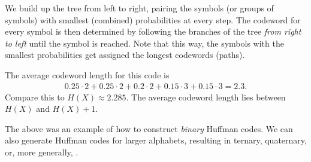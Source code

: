 \begin{example}
\begin{center}
\end{center}
We build up the tree from left to right, pairing the symbols (or groups of symbols) with smallest (combined) probabilities at every step. The codeword for every symbol is then determined by following the branches of the tree \emph{from right to left} until the symbol is reached. Note that this way, the symbols with the smallest probabilities get assigned the longest codewords (paths).

The average codeword length for this code is
\begin{align}
0.25 \cdot 2 + 0.25 \cdot 2 + 0.2 \cdot 2 + 0.15 \cdot 3 + 0.15 \cdot 3 = 2.3. 
\end{align}
Compare this to $H(X) \approx 2.285$. The average codeword length lies between $H(X)$ and $H(X) + 1$.
\end{example}

The above was an example of how to construct \emph{binary} Huffman codes. We can also generate Huffman codes for larger alphabets, resulting in ternary, quaternary, or, more generally, .

